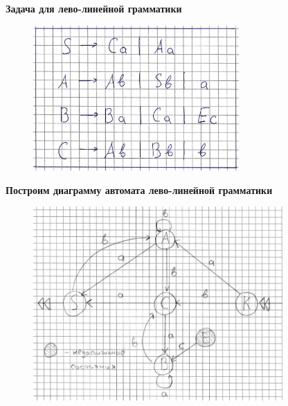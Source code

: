 \documentclass[a4paper, 14pt]{extarticle}
\begin{document}
\newpage

\vfill

\begin{center}
  \normalsize
  \bfseries
  Задача для лево-линейной грамматики
\end{center}

\vspace{-5pt}

\begin{figure}[h]
  \centering
  \includegraphics[width=0.7\textwidth,height=0.7\textheight,keepaspectratio]{one}
\end{figure}

\vfill

\begin{center}
  \normalsize
  \bfseries
  Построим диаграмму автомата лево-линейной грамматики
\end{center}

\begin{figure}[h]
  \centering
  \includegraphics[width=0.85\textwidth,height=0.85\textheight,keepaspectratio]{two}
\end{figure}
\end{document}
